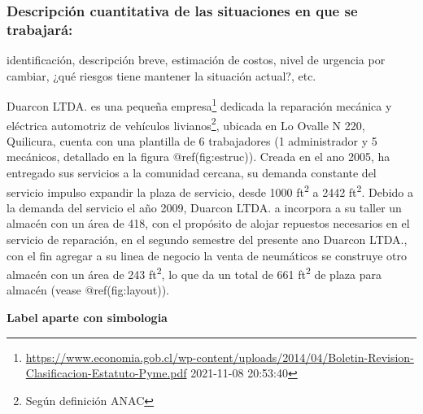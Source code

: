 \documentclass[
]{article}
\begin{document}
\hypertarget{descripciuxf3n-cuantitativa-de-las-situaciones-en-que-se-trabajaruxe1}{%
\subsubsection{Descripción cuantitativa de las situaciones en que se
trabajará:}\label{descripciuxf3n-cuantitativa-de-las-situaciones-en-que-se-trabajaruxe1}}

identificación, descripción breve, estimación de costos, nivel de
urgencia por cambiar, ¿qué riesgos tiene mantener la situación actual?,
etc.

Duarcon LTDA. es una pequeña empresa\footnote{\url{https://www.economia.gob.cl/wp-content/uploads/2014/04/Boletin-Revision-Clasificacion-Estatuto-Pyme.pdf}
  2021-11-08 20:53:40} dedicada la reparación mecánica y eléctrica
automotriz de vehículos livianos\footnote{Según definición ANAC},
ubicada en Lo Ovalle N 220, Quilicura, cuenta con una plantilla de 6
trabajadores (1 administrador y 5 mecánicos, detallado en la figura
@ref(fig:estruc)). Creada en el ano 2005, ha entregado sus servicios a
la comunidad cercana, su demanda constante del servicio impulso expandir
la plaza de servicio, desde 1000 ft\textsuperscript{2} a 2442
ft\textsuperscript{2}. Debido a la demanda del servicio el año 2009,
Duarcon LTDA. a incorpora a su taller un almacén con un área de 418, con
el propósito de alojar repuestos necesarios en el servicio de
reparación, en el segundo semestre del presente ano Duarcon LTDA., con
el fin agregar a su linea de negocio la venta de neumáticos se construye
otro almacén con un área de 243 ft\textsuperscript{2}, lo que da un
total de 661 ft\textsuperscript{2} de plaza para almacén (vease
@ref(fig:layout)).

\textbf{Label aparte con simbologia}
\end{document}
